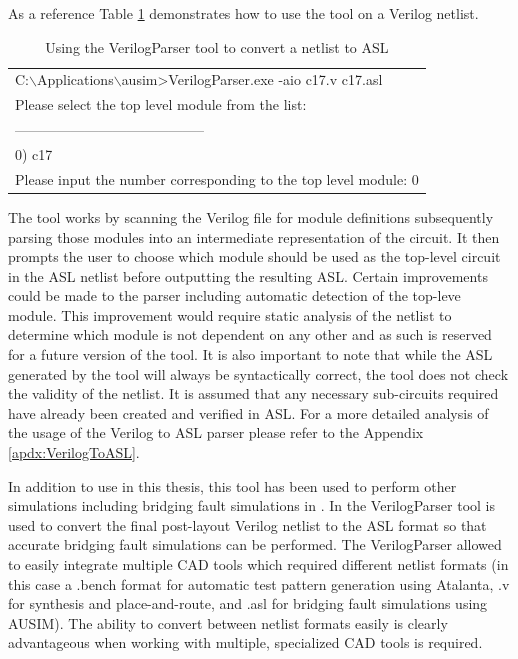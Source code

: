 \documentclass[12pt]{report}
\begin{document}
As a reference Table \ref{tbl:VerilogParserUse} demonstrates how to use the tool on a Verilog netlist.
\begin{table}
  \begin{center}
    \caption{Using the VerilogParser tool to convert a netlist to ASL}
    \begin{tabular}{|l|}
        \hline
        C:$\backslash$Applications$\backslash$ausim\textgreater VerilogParser.exe -aio c17.v c17.asl \\
        Please select the top level module from the list: \\
        -----------------------------------------\\
        0) c17 \\
        Please input the number corresponding to the top level module: 0 \\
        \hline
    \end{tabular}
  \end{center}
  \label{tbl:VerilogParserUse}
\end{table}
The tool works by scanning the Verilog file for module definitions subsequently parsing those modules into an intermediate representation of the circuit.  It then prompts the user to choose which module should be used as the top-level circuit in the ASL netlist before outputting the resulting ASL.  Certain improvements could be made to the parser including automatic detection of the top-leve module.  This improvement would require static analysis of the netlist to determine which module is not dependent on any other and as such is reserved for a future version of the tool.  It is also important to note that while the ASL generated by the tool will always be syntactically correct, the tool does not check the validity of the netlist.  It is assumed that any necessary sub-circuits required have already been created and verified in ASL.  For a more detailed analysis of the usage of the Verilog to ASL parser please refer to the Appendix \ref{apdx:VerilogToASL}.  

In addition to use in this thesis, this tool has been used to perform other simulations including bridging fault simulations in \cite{james}.  In \cite{james} the VerilogParser tool is used to convert the final post-layout Verilog netlist to the ASL format so that accurate bridging fault simulations can be performed.  The VerilogParser allowed \cite{james} to easily integrate multiple CAD tools which required different netlist formats (in this case a .bench format for automatic test pattern generation using Atalanta, .v for synthesis and place-and-route, and .asl for bridging fault simulations using AUSIM).  The ability to convert between netlist formats easily is clearly advantageous when working with multiple, specialized CAD tools is required.
\end{document}

